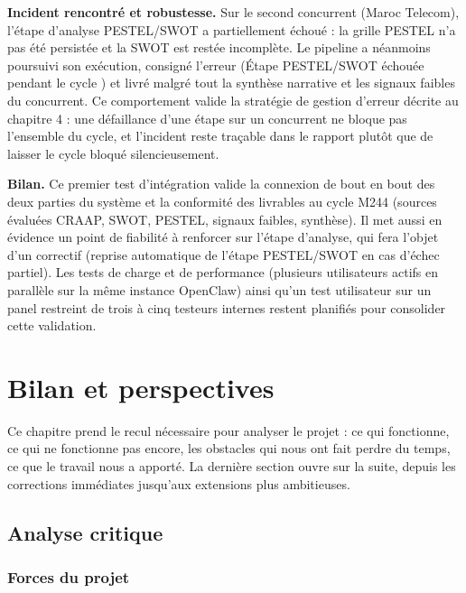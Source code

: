 \documentclass[12pt,a4paper,openany]{report}
\begin{document}
\textbf{Incident rencontré et robustesse.} Sur le second concurrent (Maroc Telecom), l'étape d'analyse PESTEL/SWOT a partiellement échoué : la grille PESTEL n'a pas été persistée et la SWOT est restée incomplète. Le pipeline a néanmoins poursuivi son exécution, consigné l'erreur (\og Étape PESTEL/SWOT échouée pendant le cycle \fg{}) et livré malgré tout la synthèse narrative et les signaux faibles du concurrent. Ce comportement valide la stratégie de gestion d'erreur décrite au chapitre 4 : une défaillance d'une étape sur un concurrent ne bloque pas l'ensemble du cycle, et l'incident reste traçable dans le rapport plutôt que de laisser le cycle bloqué silencieusement.

\textbf{Bilan.} Ce premier test d'intégration valide la connexion de bout en bout des deux parties du système et la conformité des livrables au cycle M244 (sources évaluées CRAAP, SWOT, PESTEL, signaux faibles, synthèse). Il met aussi en évidence un point de fiabilité à renforcer sur l'étape d'analyse, qui fera l'objet d'un correctif (reprise automatique de l'étape PESTEL/SWOT en cas d'échec partiel). Les tests de charge et de performance (plusieurs utilisateurs actifs en parallèle sur la même instance OpenClaw) ainsi qu'un test utilisateur sur un panel restreint de trois à cinq testeurs internes restent planifiés pour consolider cette validation.

\chapter{Bilan et perspectives}
\label{chap:bilan}

Ce chapitre prend le recul nécessaire pour analyser le projet : ce qui fonctionne, ce qui ne fonctionne pas encore, les obstacles qui nous ont fait perdre du temps, ce que le travail nous a apporté. La dernière section ouvre sur la suite, depuis les corrections immédiates jusqu'aux extensions plus ambitieuses.

\section{Analyse critique}
\label{sec:analyse-critique}

\subsection{Forces du projet}
\label{sec:forces}
\end{document}
